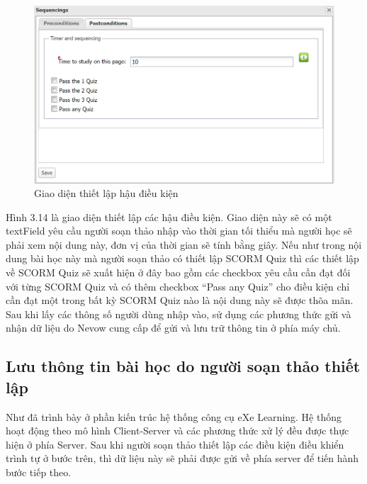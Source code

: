 		\begin{center}
	\begin{figure}[htp]
		\begin{center}
			\includegraphics[width=15cm]{Chapter3/Pictures/picture314.png}
		\end{center}
		\caption{Giao diện thiết lập hậu điều kiện}
		\label{refpicture415}
	\end{figure}
\end{center}


Hình 3.14 là giao diện thiết lập các hậu điều kiện. Giao diện này sẽ có một textField yêu cầu người soạn thảo nhập vào thời gian tối thiểu mà người học sẽ phải xem nội dung này, đơn vị của thời gian sẽ tính bằng giây.
Nếu như trong nội dung bài học này mà người soạn thảo có thiết lập SCORM Quiz thì các thiết lập về SCORM Quiz sẽ xuất hiện ở đây bao gồm các checkbox yêu cầu cần đạt đối với từng SCORM Quiz và có thêm checkbox “Pass any Quiz” cho điều kiện chỉ cần đạt một trong bất kỳ SCORM Quiz nào là nội dung này sẽ được thõa mãn. Sau khi lấy các thông số người dùng nhập vào, sử dụng các phương thức gửi và nhận dữ liệu do Nevow cung cấp để gửi và lưu trữ thông tin ở phía máy chủ.


\subsection{Lưu thông tin bài học do người soạn thảo thiết lập}

Như đã trình bày ở phần kiến trúc hệ thống công cụ eXe Learning. Hệ thống hoạt động theo mô hình Client-Server và các phương thức xử lý đều được thực hiện ở phía Server. Sau khi người soạn thảo thiết lập các điều kiện điều khiển trình tự ở bước trên, thì dữ liệu này sẽ phải được gửi về phía server để tiến hành bước tiếp theo.

